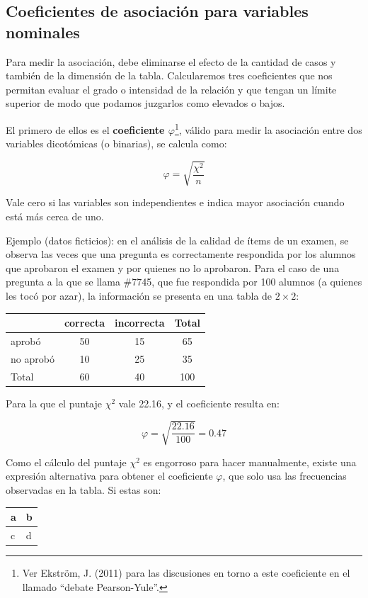 \documentclass[]{book}
\let\rmarkdownfootnote\footnote%
\def\footnote{\protect\rmarkdownfootnote}
\begin{document}
\hypertarget{coeficientes-de-asociacion-para-variables-nominales}{%
\subsection{Coeficientes de asociación para variables nominales}\label{coeficientes-de-asociacion-para-variables-nominales}}

Para medir la asociación, debe eliminarse el efecto de la cantidad de
casos y también de la dimensión de la tabla. Calcularemos tres
coeficientes que nos permitan evaluar el grado o intensidad de la
relación y que tengan un límite superior de modo que podamos juzgarlos como elevados o bajos.

El primero de ellos es el \textbf{coeficiente \(\varphi\)}\footnote{Ver Ekström, J. (2011) para las discusiones en torno a este coeficiente en el llamado ``debate Pearson-Yule''.}, válido para medir la asociación entre dos variables dicotómicas (o binarias), se calcula como:

\[\varphi = \sqrt{\frac{\chi^{2}}{n}}\]

Vale cero si las variables son independientes e indica mayor asociación cuando está más cerca de uno.

Ejemplo (datos ficticios): en el análisis de la calidad de ítems de un examen, se observa las veces que una pregunta es correctamente
respondida por los alumnos que aprobaron el examen y por quienes no lo aprobaron. Para el caso de una pregunta a la que se llama \#7745, que fue respondida por 100 alumnos (a quienes les tocó por azar), la
información se presenta en una tabla de \(2 \times 2\):

\begin{longtable}[]{@{}lccc@{}}
\toprule
& correcta & incorrecta & Total\tabularnewline
\midrule
\endhead
aprobó & 50 & 15 & 65\tabularnewline
no aprobó & 10 & 25 & 35\tabularnewline
Total & 60 & 40 & 100\tabularnewline
\bottomrule
\end{longtable}

Para la que el puntaje \(\chi^{2}\) vale 22.16, y el coeficiente resulta en:

\[\varphi = \sqrt{\frac{22.16}{100}} = 0.47\]

Como el cálculo del puntaje \(\chi^{2}\) es engorroso para hacer
manualmente, existe una expresión alternativa para obtener el coeficiente \(\varphi\), que solo usa las frecuencias observadas en la tabla. Si estas son:

\begin{longtable}[]{@{}ll@{}}
\toprule
a & b\tabularnewline
\midrule
\endhead
c & d\tabularnewline
\bottomrule
\end{longtable}
\end{document}
